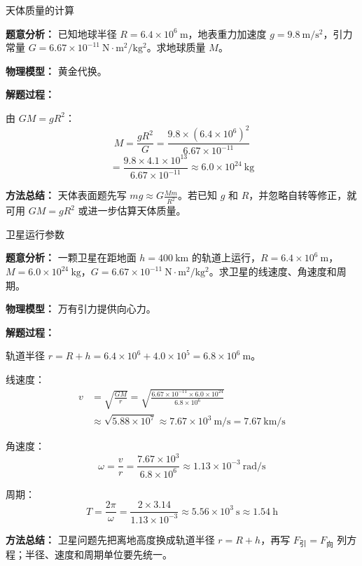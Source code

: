 \begin{examplebox}{天体质量的计算}

\textbf{题意分析：} 已知地球半径 $R = 6.4 \times 10^6\ \mathrm{m}$，地表重力加速度 $g = 9.8\ \mathrm{m/s^2}$，引力常量 $G = 6.67 \times 10^{-11}\ \mathrm{N\cdot m^2/kg^2}$。求地球质量 $M$。

\textbf{物理模型：} 黄金代换。

\textbf{解题过程：}

由 $GM = gR^2$：
\[
M = \frac{gR^2}{G} = \frac{9.8 \times (6.4 \times 10^6)^2}{6.67 \times 10^{-11}}
\]
\[
= \frac{9.8 \times 4.1 \times 10^{13}}{6.67 \times 10^{-11}} \approx 6.0 \times 10^{24}\ \mathrm{kg}
\]

\textbf{方法总结：} 天体表面题先写 $mg\approx G\frac{Mm}{R^2}$。若已知 $g$ 和 $R$，并忽略自转等修正，就可用 $GM=gR^2$ 或进一步估算天体质量。

\end{examplebox}

\begin{examplebox}{卫星运行参数}

\textbf{题意分析：} 一颗卫星在距地面 $h = 400\ \mathrm{km}$ 的轨道上运行，$R = 6.4 \times 10^6\ \mathrm{m}$，$M = 6.0 \times 10^{24}\ \mathrm{kg}$，$G = 6.67 \times 10^{-11}\ \mathrm{N\cdot m^2/kg^2}$。求卫星的线速度、角速度和周期。

\textbf{物理模型：} 万有引力提供向心力。

\textbf{解题过程：}

轨道半径 $r = R + h = 6.4 \times 10^6 + 4.0 \times 10^5 = 6.8 \times 10^6\ \mathrm{m}$。

线速度：
\[
\begin{aligned}
v &= \sqrt{\frac{GM}{r}}
 = \sqrt{\frac{6.67 \times 10^{-11} \times 6.0 \times 10^{24}}{6.8 \times 10^6}} \\
&\approx \sqrt{5.88 \times 10^7}
 \approx 7.67 \times 10^3\ \mathrm{m/s}
 = 7.67\ \mathrm{km/s}
\end{aligned}
\]

角速度：
\[
\omega = \frac{v}{r} = \frac{7.67 \times 10^3}{6.8 \times 10^6} \approx 1.13 \times 10^{-3}\ \mathrm{rad/s}
\]

周期：
\[
T = \frac{2\pi}{\omega} = \frac{2 \times 3.14}{1.13 \times 10^{-3}} \approx 5.56 \times 10^3\ \mathrm{s} \approx 1.54\ \mathrm{h}
\]

\textbf{方法总结：} 卫星问题先把离地高度换成轨道半径 $r=R+h$，再写 $F_{\text{引}}=F_{\text{向}}$ 列方程；半径、速度和周期单位要先统一。

\end{examplebox}

